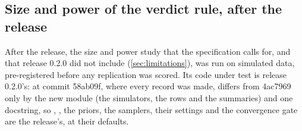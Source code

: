 \subsection{Size and power of the verdict rule, after the release}\label{app:dgp}

After the release, the size and power study that the specification calls for, and that release
0.2.0 did not include (\cref{sec:limitations}), was run on simulated data, pre-registered before any
replication was scored. Its code under test is release 0.2.0's: at commit 58ab09f, where every
record was made,  differs from 4ac7969 only by the new module
 (the simulators, the rows and the summaries) and one docstring, so
, , the priors, the samplers, their settings and the convergence gate
are the release's, at their defaults.

